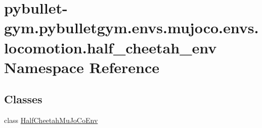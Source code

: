 \hypertarget{namespacepybullet-gym_1_1pybulletgym_1_1envs_1_1mujoco_1_1envs_1_1locomotion_1_1half__cheetah__env}{}\section{pybullet-\/gym.pybulletgym.\+envs.\+mujoco.\+envs.\+locomotion.\+half\+\_\+cheetah\+\_\+env Namespace Reference}
\label{namespacepybullet-gym_1_1pybulletgym_1_1envs_1_1mujoco_1_1envs_1_1locomotion_1_1half__cheetah__env}
\subsection*{Classes}
\begin{DoxyCompactItemize}
\item 
class \hyperlink{classpybullet-gym_1_1pybulletgym_1_1envs_1_1mujoco_1_1envs_1_1locomotion_1_1half__cheetah__env_1_1_half_cheetah_mu_jo_co_env}{Half\+Cheetah\+Mu\+Jo\+Co\+Env}
\end{DoxyCompactItemize}
